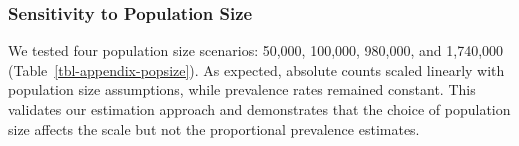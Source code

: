 \documentclass[
  12pt,
  letterpaper,
  DIV=11,
  numbers=noendperiod]{scrartcl}
\theoremstyle{plain}
\theoremstyle{definition}
\begin{document}
\subsubsection{Sensitivity to Population
Size}\label{sensitivity-to-population-size}

We tested four population size scenarios: 50,000, 100,000, 980,000, and
1,740,000 (Table~\ref{tbl-appendix-popsize}). As expected, absolute
counts scaled linearly with population size assumptions, while
prevalence rates remained constant. This validates our estimation
approach and demonstrates that the choice of population size affects the
scale but not the proportional prevalence estimates.

\begin{table}

\caption{\label{tbl-appendix-popsize}Sensitivity Analysis: Population
Size Comparison. All estimates use neighborhood bootstrap, SS weights,
and MBSU (Moderate) adjustment. Source: Authors' Own Work.}

\centering{

\centering\begingroup\fontsize{8}{10}\selectfont

}
\end{table}
\end{document}
